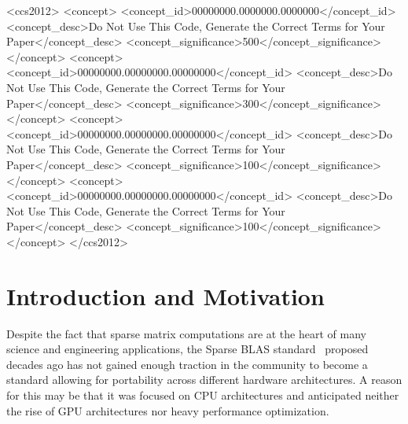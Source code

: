 \documentclass[manuscript,review]{acmart}
\begin{document}
\begin{CCSXML}
<ccs2012>
 <concept>
  <concept_id>00000000.0000000.0000000</concept_id>
  <concept_desc>Do Not Use This Code, Generate the Correct Terms for Your Paper</concept_desc>
  <concept_significance>500</concept_significance>
 </concept>
 <concept>
  <concept_id>00000000.00000000.00000000</concept_id>
  <concept_desc>Do Not Use This Code, Generate the Correct Terms for Your Paper</concept_desc>
  <concept_significance>300</concept_significance>
 </concept>
 <concept>
  <concept_id>00000000.00000000.00000000</concept_id>
  <concept_desc>Do Not Use This Code, Generate the Correct Terms for Your Paper</concept_desc>
  <concept_significance>100</concept_significance>
 </concept>
 <concept>
  <concept_id>00000000.00000000.00000000</concept_id>
  <concept_desc>Do Not Use This Code, Generate the Correct Terms for Your Paper</concept_desc>
  <concept_significance>100</concept_significance>
 </concept>
</ccs2012>
\end{CCSXML}




\maketitle



\section{Introduction and Motivation}

Despite the fact that sparse matrix computations are at the heart of many science and engineering applications, the Sparse BLAS standard~\cite{10.1145/567806.567810} proposed decades ago has not gained enough traction in the community to become a standard allowing for portability across different hardware architectures. A reason for this may be that it was focused on CPU architectures and anticipated neither the rise of GPU architectures nor heavy performance optimization.
\end{document}
